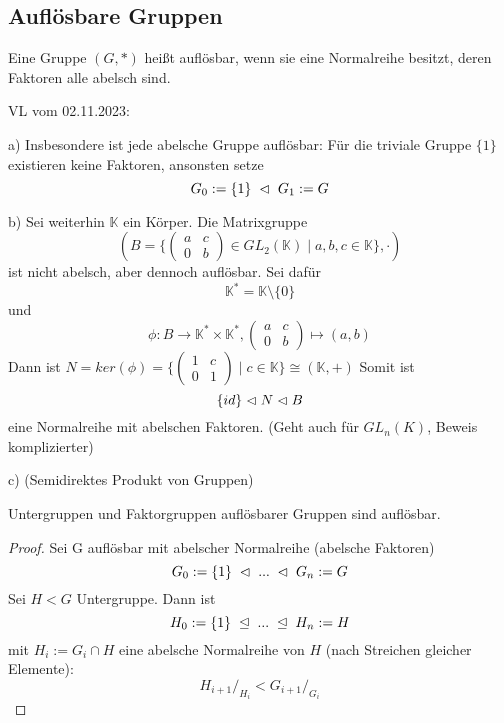 \documentclass[../main.tex]{subfiles}
\begin{document}
\subsection{Auflösbare Gruppen}
\begin{definition}
    Eine Gruppe $(G,*)$ heißt auflösbar, wenn sie eine Normalreihe besitzt, deren Faktoren alle abelsch sind.
\end{definition}
\begin{flushright}
VL vom 02.11.2023:
\end{flushright}
\begin{example}
    a) Insbesondere ist jede abelsche Gruppe auflösbar: Für die triviale Gruppe $\{1\}$ existieren keine Faktoren, ansonsten setze $$G_0 := \{1\} \; \vartriangleleft \; G_1 := G$$

    b) Sei weiterhin $\mathbb{K}$ ein Körper. Die Matrixgruppe $$(B = \{\begin{pmatrix} a & c \\ 0 & b \end{pmatrix} \in GL_2(\mathbb{K}) \mid a,b,c \in \mathbb{K}\}, \cdot)$$ ist nicht abelsch, aber dennoch auflösbar. Sei dafür $$\mathbb{K}^* = \mathbb{K}\setminus\{0\}$$ und $$\phi: B \rightarrow \mathbb{K}^* \times \mathbb{K}^*, \begin{pmatrix} a & c \\ 0 & b
    \end{pmatrix} \mapsto (a,b)$$ Dann ist $N = ker(\phi) = \{\begin{pmatrix}
        1 & c \\ 0 & 1
    \end{pmatrix} \mid c \in \mathbb{K}\} \cong (\mathbb{K},+)$ Somit ist $$\{id\} \vartriangleleft N \vartriangleleft B$$ eine Normalreihe mit abelschen Faktoren. (Geht auch für $GL_n(K)$, Beweis komplizierter)

    c) (Semidirektes Produkt von Gruppen) \TODO
\end{example}
\begin{theorem}\label{thm:ug:aufloesbar}\label{theo:1.12}
    Untergruppen und Faktorgruppen auflösbarer Gruppen sind auflösbar.
\end{theorem}
\begin{proof}
    Sei G auflösbar mit abelscher Normalreihe (abelsche Faktoren) 
    $$G_0 := \{1\} \; \vartriangleleft \; ... \; \vartriangleleft \; G_n := G$$
    Sei $H < G$ Untergruppe. Dann ist $$H_0 := \{1\} \; \trianglelefteq \; ... \; \trianglelefteq \; H_n := H$$ mit $H_i := G_i \cap H$ eine abelsche Normalreihe von $H$ (nach Streichen gleicher Elemente):
    $$H_{i+1}/_{H_i} < G_{i+1}/_{G_i}$$
\end{proof}
\end{document}
